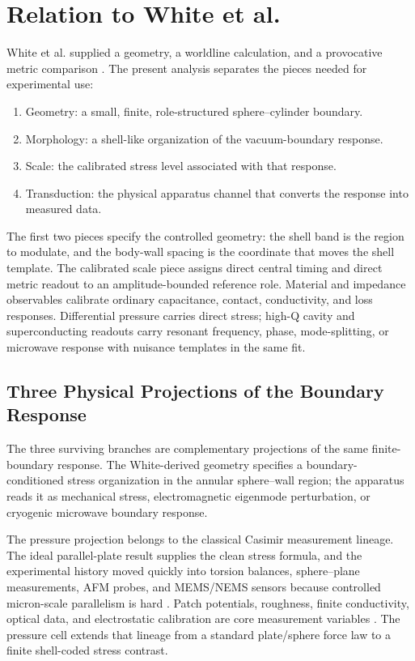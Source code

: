 \documentclass[11pt]{article}
\begin{document}
\section{Relation to White et al.}

White et al. supplied a geometry, a worldline calculation, and a provocative
metric comparison \cite{White2021}. The present analysis separates the pieces
needed for experimental use:
\begin{enumerate}
\item Geometry: a small, finite, role-structured sphere--cylinder boundary.
\item Morphology: a shell-like organization of the vacuum-boundary response.
\item Scale: the calibrated stress level associated with that response.
\item Transduction: the physical apparatus channel that converts the response
into measured data.
\end{enumerate}

The first two pieces specify the controlled geometry: the shell band is the
region to modulate, and the body-wall spacing is the coordinate that moves the
shell template. The calibrated scale piece assigns direct central
timing and direct metric readout to an amplitude-bounded reference role.
Material and impedance observables calibrate ordinary capacitance, contact,
conductivity, and loss responses. Differential pressure carries direct stress;
high-Q cavity and superconducting readouts carry resonant frequency, phase,
mode-splitting, or microwave response with nuisance templates in the same fit.

\subsection{Three Physical Projections of the Boundary Response}

The three surviving branches are complementary projections of the same
finite-boundary response. The White-derived geometry specifies a
boundary-conditioned stress organization in the annular sphere--wall region;
the apparatus reads it as mechanical stress, electromagnetic eigenmode
perturbation, or cryogenic microwave boundary response.

The pressure projection belongs to the classical Casimir measurement lineage.
The ideal parallel-plate result supplies the clean stress formula, and the
experimental history moved quickly into torsion balances, sphere--plane
measurements, AFM probes, and MEMS/NEMS sensors because controlled micron-scale
parallelism is hard \cite{Lamoreaux1997,MohideenRoy1998,Decca2011,Stange2019}.
Patch potentials, roughness, finite conductivity, optical data, and
electrostatic calibration are core measurement variables
\cite{Bimonte2021,Behunin2011,Garrett2015}. The pressure cell extends that
lineage from a standard plate/sphere force law to a finite shell-coded stress
contrast.
\end{document}
